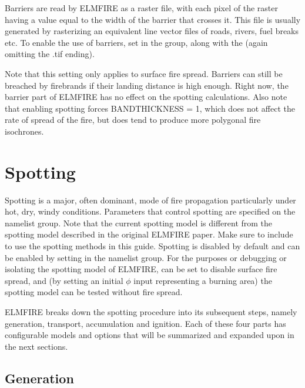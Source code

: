 Barriers are read by ELMFIRE as a raster file, with each pixel of the raster having a value equal to the width of the barrier that crosses it. This file is usually generated by rasterizing an equivalent line vector files of roads, rivers, fuel breaks etc. To enable the use of barriers, set  in the  group, along with the  (again omitting the .tif ending). 

Note that this setting only applies to surface fire spread. Barriers can still be breached by firebrands if their landing distance is high enough. Right now, the barrier part of ELMFIRE has no effect on the spotting calculations. Also note that enabling spotting forces BANDTHICKNESS = 1, which does not affect the rate of spread of the fire, but does tend to produce more polygonal fire isochrones. 

\section{Spotting}
\label{spotting}

Spotting is a major, often dominant, mode of fire propagation particularly under hot, dry, windy conditions. Parameters that control spotting are specified on the  namelist group. Note that the current spotting model is different from the spotting model described in the original ELMFIRE paper. Make sure to include  to use the spotting methods in this guide. Spotting is disabled by default and can be enabled by setting  in the  namelist group. For the purposes or debugging or isolating the spotting model of ELMFIRE,  can be set to disable surface fire spread, and (by setting an initial $\phi$ input representing a burning area) the spotting model can be tested without fire spread.

ELMFIRE breaks down the spotting procedure into its subsequent steps, namely generation, transport, accumulation and ignition. Each of these four parts has configurable models and options that will be summarized and expanded upon in the next sections.

\subsection{Generation}
\label{ember_generation}

